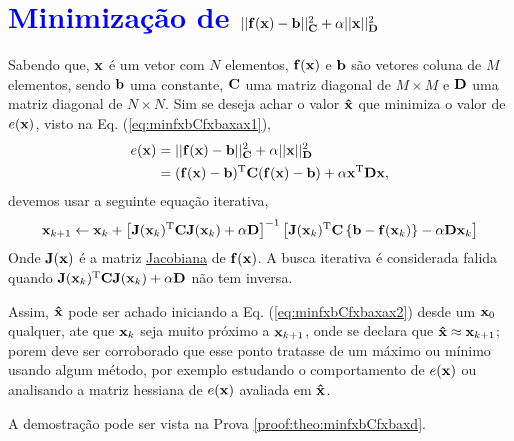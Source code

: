 

\section{\textcolor{blue}{Minimização de $||\VECTOR{f}(\VECTOR{x})-\VECTOR{b}||_{\MATRIX{C}}^2+\alpha||\VECTOR{x}||_{\MATRIX{D}}^2$}
}

\begin{theorem}\label{theo:minfxbCfxbaxax}
Sabendo que, $\VECTOR{x}$ é um vetor com $N$ elementos, $\VECTOR{f}(\VECTOR{x})$ e 
$\VECTOR{b}$ são vetores coluna de $M$ elementos, sendo $\VECTOR{b}$ uma constante,
$\MATRIX{C}$ uma matriz diagonal de $M \times M$ e 
$\MATRIX{D}$ uma matriz diagonal de $N \times N$.
Sim se deseja achar o valor $\VECTOR{\hat{x}}$ que minimiza o valor de $e(\VECTOR{x})$, visto na Eq. (\ref{eq:minfxbCfxbaxax1}),
\begin{align}\label{eq:minfxbCfxbaxax1}
e(\VECTOR{x}) & =||\VECTOR{f}(\VECTOR{x})-\VECTOR{b}||_{\MATRIX{C}}^2+\alpha||\VECTOR{x}||_{\MATRIX{D}}^2\\
              & = (\VECTOR{f}(\VECTOR{x})-\VECTOR{b})^{\transpose}\MATRIX{C}(\VECTOR{f}(\VECTOR{x})-\VECTOR{b})+\alpha\VECTOR{x}^{\transpose}\MATRIX{D}\VECTOR{x},
\end{align}
devemos usar a seguinte equação iterativa,
\begin{equation}\label{eq:minfxbCfxbaxax2}
\VECTOR{x}_{k+1}\leftarrow \VECTOR{x}_k+
\left[ \MATRIX{J}(\VECTOR{x}_k)^{\transpose}\MATRIX{C} \MATRIX{J}(\VECTOR{x}_k) +\alpha\MATRIX{D} \right]^{-1}
 \left[\MATRIX{J}(\VECTOR{x}_k)^{\transpose}\MATRIX{C}\left\{\VECTOR{b}-\VECTOR{f}(\VECTOR{x}_k)\right\}-\alpha\MATRIX{D}\VECTOR{x}_k\right]
\end{equation}
Onde  $\MATRIX{J}(\VECTOR{x})$ é a matriz \hyperref[def:jacobian]{Jacobiana} \cite{Jacobian} de $\VECTOR{f}(\VECTOR{x})$.
A busca iterativa é considerada falida quando 
$\MATRIX{J}(\VECTOR{x}_k)^{\transpose}\MATRIX{C} \MATRIX{J}(\VECTOR{x}_k) +\alpha\MATRIX{D}$
não tem inversa.


Assim, $\VECTOR{\hat{x}}$ pode ser achado iniciando a Eq. (\ref{eq:minfxbCfxbaxax2}) desde um $\VECTOR{x}_{0}$ qualquer, ate que $\VECTOR{x}_{k}$ seja muito próximo a $\VECTOR{x}_{k+1}$,
onde se declara que $\VECTOR{\hat{x}} \approx \VECTOR{x}_{k+1}$; porem deve ser corroborado
que esse ponto tratasse de um máximo ou mínimo usando algum método, por exemplo estudando o comportamento 
de $e(\VECTOR{x})$ ou analisando a matriz hessiana de $e(\VECTOR{x})$ avaliada em $\VECTOR{\hat{x}}$.

A demostração pode ser vista na Prova \ref{proof:theo:minfxbCfxbaxd}.
\end{theorem} 

